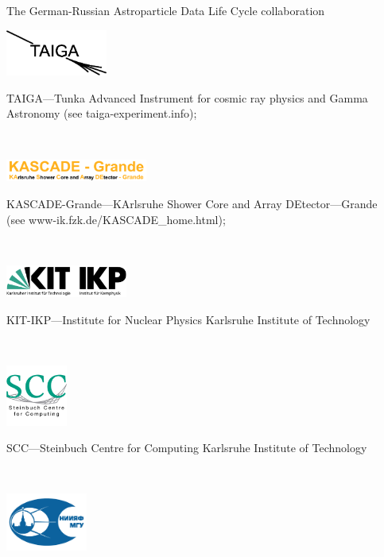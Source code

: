 \documentclass[18pt]{beamer}
\begin{document}
\begin{frame}[allowframebreaks]
{The German-Russian Astroparticle Data Life Cycle collaboration}
\parbox{0.35\textwidth}{
  \centering\includegraphics[width=0.25\textwidth]{pics/taiga.eps}
}\hfill
\parbox{0.60\textwidth}{
  TAIGA---Tunka Advanced Instrument for cosmic ray physics and Gamma Astronomy (see
  taiga-experiment.info);
}
\\\vspace{1em}
\parbox{0.35\textwidth}{
  \centering\includegraphics[width=0.35\textwidth]{pics/grande.pdf}
}\hfill
\parbox{0.60\textwidth}{
  KASCADE-Grande---KArlsruhe Shower Core and Array DEtector---Grande\\ (see
  www-ik.fzk.de/KASCADE\_home.html);
}
\\\vspace{1em}
\parbox{0.35\textwidth}{
  \centering\includegraphics[width=0.30\textwidth]{pics/Logo_KIT_IKP.pdf}
}\hfill
\parbox{0.60\textwidth}{
  KIT-IKP---Institute for Nuclear Physics Karlsruhe Institute of Technology
}
\\\vspace{1em}
\parbox{0.35\textwidth}{
  \centering\includegraphics[width=0.15\textwidth]{pics/SCC-Logo.png}
}\hfill
\parbox{0.60\textwidth}{
  SCC---Steinbuch Centre for Computing Karlsruhe Institute of Technology
}
\\\vspace{1em}
\parbox{0.20\textwidth}{
  \centering\includegraphics[width=0.20\textwidth]{pics/SINP_MSU_LOGO.pdf}
}\hfill
\parbox{0.75\textwidth}{
}
\end{frame}
\end{document}
